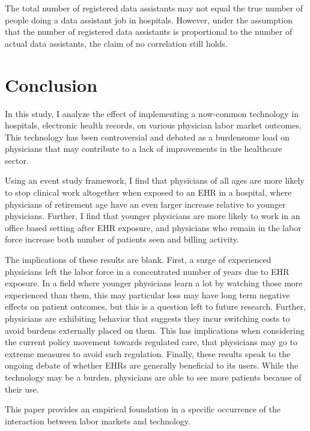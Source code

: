 \documentclass[11pt]{article}
\begin{document}
The total number of registered data assistants may not equal the true number of people doing a data assistant job in hospitals. However, under the assumption that the number of registered data assistants is proportional to the number of actual data assistants, the claim of no correlation still holds. 

\section{Conclusion}

In this study, I analyze the effect of implementing a now-common technology in hospitals, electronic health records, on various physician labor market outcomes. This technology has been controversial and debated as a burdensome load on physicians that may contribute to a lack of improvements in the healthcare sector. 

Using an event study framework, I find that physicians of all ages are more likely to stop clinical work altogether when exposed to an EHR in a hospital, where physicians of retirement age have an even larger increase relative to younger physicians. Further, I find that younger physicians are more likely to work in an office based setting after EHR exposure, and physicians who remain in the labor force increase both number of patients seen and billing activity. 

The implications of these results are blank. First, a surge of experienced physicians left the labor force in a concentrated number of years due to EHR exposure. In a field where younger physicians learn a lot by watching those more experienced than them, this may particular loss may have long term negative effects on patient outcomes, but this is a question left to future research. Further, physicians are exhibiting behavior that suggests they incur switching costs to avoid burdens externally placed on them. This has implications when considering the current policy movement towards regulated care, that physicians may go to extreme measures to avoid such regulation. Finally, these results speak to the ongoing debate of whether EHRs are generally beneficial to its users. While the technology may be a burden, physicians are able to see more patients because of their use. 

This paper provides an empirical foundation in a specific occurrence of the interaction between labor markets and technology.




\renewcommand*{\bibfont}{\footnotesize}

\printbibliography

\newpage

\appendix

\section{}
\end{document}
